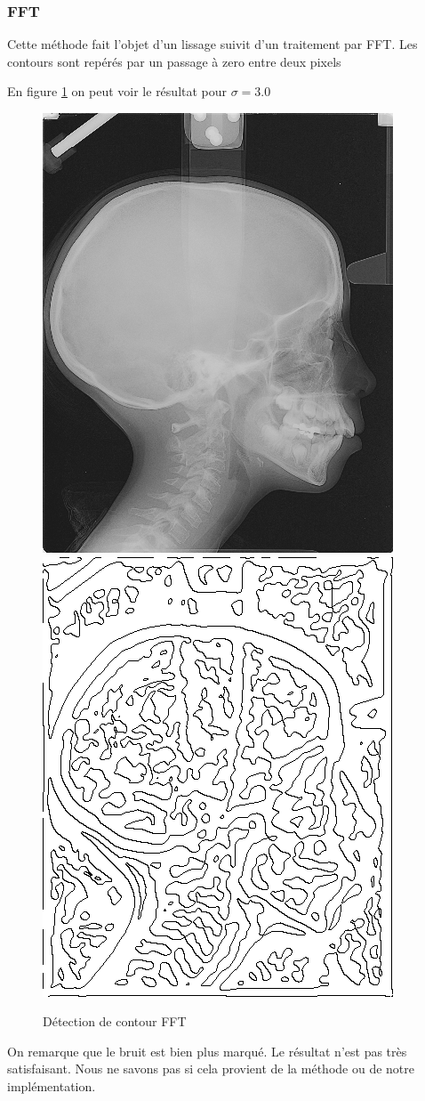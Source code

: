 \documentclass[paper=a4, fontsize=11pt]{scrartcl} %
\begin{document}
\subsubsection{FFT}
Cette méthode fait l'objet d'un lissage suivit d'un traitement par FFT. 
Les contours sont repérés par un passage à zero entre deux pixels

En figure \ref{FFavap} on peut voir le résultat pour $\sigma=3.0$

\begin{figure}
\centering
\caption{Détection de contour FFT}
	\label{FFavap}
	\includegraphics[scale=0.5]{images/rapport/radio1.png} 
	\includegraphics[scale=0.5]{images/rapport/coucou3.png}
\end{figure}
On remarque que le bruit est bien plus marqué. Le résultat n'est pas très satisfaisant. Nous ne savons pas si cela provient de la méthode ou de notre implémentation. 
\end{document}
